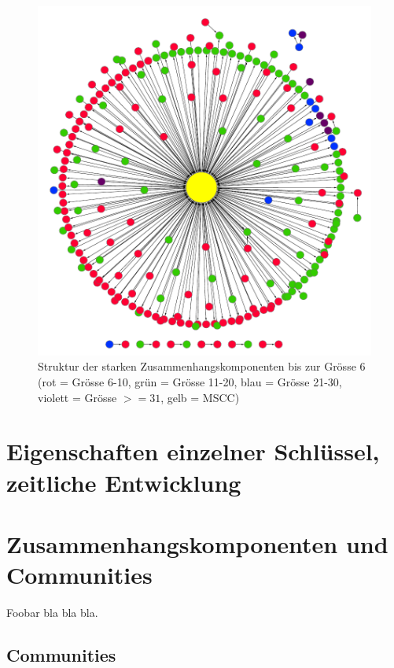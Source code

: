 \begin{figure}[th!]
  \centering
  \includegraphics[scale=1.0]{images/component-metagraph-8.pdf}
  \caption{Struktur der starken Zusammenhangskomponenten bis zur
    Grösse 6 (rot = Grösse 6-10, grün = Grösse 11-20, blau = Grösse
    21-30, violett = Grösse $>= 31$, gelb = MSCC)}
  \label{fig:komponenten-struktur}
\end{figure}


\section{Eigenschaften einzelner Schl\"ussel, zeitliche Entwicklung}
\label{sec:result-key-properties}

\section{Zusammenhangskomponenten und Communities}
\label{sec:result-zusamm-und-comm}




Foobar bla bla bla.

\subsection{Communities}
\label{sec:result-communities}

